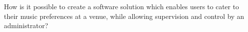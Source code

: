 How is it possible to create a software solution which enables users to cater to their music preferences at a venue, while allowing supervision and control by an administrator?
